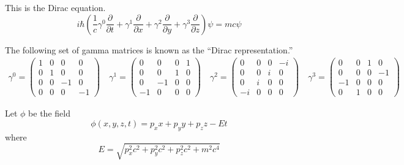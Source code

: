 \documentclass[12pt]{article}
\begin{document}
\noindent
This is the Dirac equation.
\begin{equation*}
i\hbar\left(\frac{1}{c}
\gamma^0\frac{\partial}{\partial t}+
\gamma^1\frac{\partial}{\partial x}+
\gamma^2\frac{\partial}{\partial y}+
\gamma^3\frac{\partial}{\partial z}
\right)\psi
=mc\psi
\end{equation*}

\noindent
The following set of gamma matrices is known as the ``Dirac representation.''
{\small
\begin{gather*}
\gamma^0=\begin{pmatrix}1&0&0&0\\0&1&0&0\\0&0&-1&0\\0&0&0&-1\end{pmatrix}\quad
\gamma^1=\begin{pmatrix}0&0&0&1\\0&0&1&0\\0&-1&0&0\\-1&0&0&0\end{pmatrix}\quad
\gamma^2=\begin{pmatrix}0&0&0&-i\\0&0&i&0\\0&i&0&0\\-i&0&0&0\end{pmatrix}\quad
\gamma^3=\begin{pmatrix}0&0&1&0\\0&0&0&-1\\-1&0&0&0\\0&1&0&0\end{pmatrix}
\end{gather*}
}

\noindent
Let $\phi$ be the field
\begin{equation*}
\phi(x,y,z,t)=p_xx+p_yy+p_zz-Et
\end{equation*}
where
\begin{equation*}
E=\sqrt{p_x^2c^2+p_y^2c^2+p_z^2c^2+m^2c^4}
\end{equation*}
\end{document}
